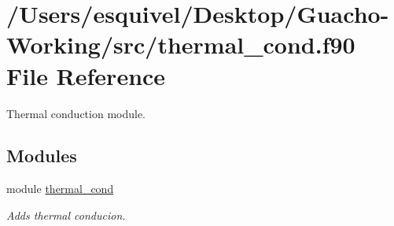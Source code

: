 \hypertarget{thermal__cond_8f90}{}\section{/\+Users/esquivel/\+Desktop/\+Guacho-\/\+Working/src/thermal\+\_\+cond.f90 File Reference}
\label{thermal__cond_8f90}


Thermal conduction module.  


\subsection*{Modules}
\begin{DoxyCompactItemize}
\item 
module \hyperlink{namespacethermal__cond}{thermal\+\_\+cond}
\begin{DoxyCompactList}\small\item\em Adds thermal conducion. \end{DoxyCompactList}\end{DoxyCompactItemize}
